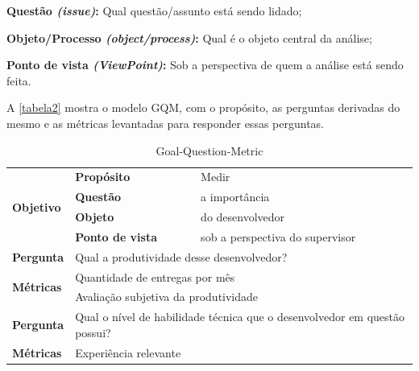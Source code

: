 \begin{alineas}
	\item \textbf{Questão \textit{(issue)}:} Qual questão/assunto está sendo lidado;
	\item \textbf{Objeto/Processo \textit{(object/process)}:} Qual é o objeto central da análise;
	\item \textbf{Ponto de vista \textit{(ViewPoint)}:} Sob a perspectiva de quem a análise está sendo feita.
\end{alineas}
	
A \autoref{tabela2} mostra o modelo GQM, com o propósito, as perguntas derivadas do mesmo e as métricas levantadas para responder essas perguntas.


\begin{table}[h]
	\caption{Goal-Question-Metric}
	\label{tabela2}
	\def\arraystretch{1.5}
	\begin{tabular}{|p{2cm}|p{6.25cm}|p{6.25cm}|}
		\hline
		\multirow{4}{*}{\textbf{Objetivo}} & \textbf{Propósito}                              & Medir                                                 \\ \cline{2-3} 
		& \textbf{Questão}                                & a importância                                         \\ \cline{2-3} 
		& \textbf{Objeto}                                 & do desenvolvedor                                      \\ \cline{2-3} 
		& \textbf{Ponto de vista}                         & sob a perspectiva do supervisor                       \\ \hline
		\textbf{Pergunta}                  & \multicolumn{2}{l|}{Qual a produtividade desse desenvolvedor?}                                          \\ \hline\hline
		\multirow{2}{*}{\textbf{Métricas}} & \multicolumn{2}{l|}{Quantidade de entregas por mês}                                                     \\ \cline{2-3} 
		& \multicolumn{2}{l|}{Avaliação subjetiva da produtividade}                                               \\ \hline\hline
		\textbf{Pergunta}                  & \multicolumn{2}{l|}{\parbox[c][1.2cm][c]{12cm}{ Qual o nível de habilidade técnica que o desenvolvedor em questão possui?}}          \\ \hline
		\multirow{4}{*}{\textbf{Métricas}} & \multicolumn{2}{l|}{Experiência relevante}                                                              \\ \cline{2-3} 

\end{tabular}
\end{table}
